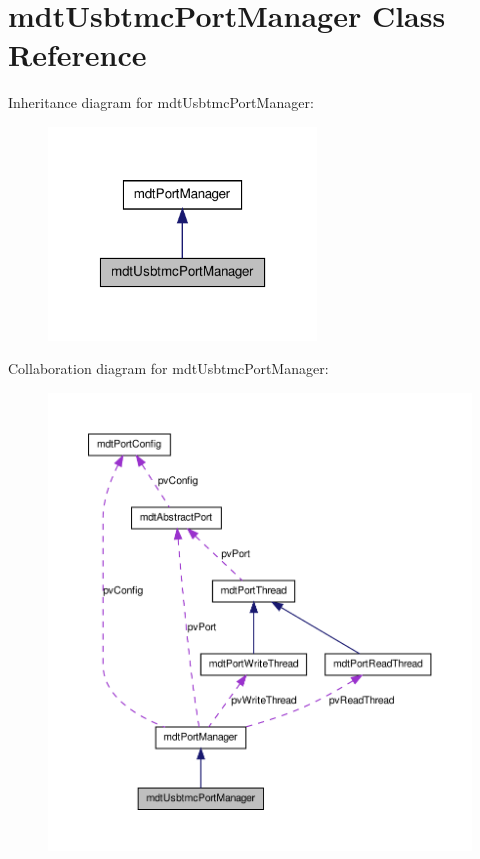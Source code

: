\hypertarget{classmdt_usbtmc_port_manager}{
\section{mdtUsbtmcPortManager Class Reference}
\label{classmdt_usbtmc_port_manager}
}


Inheritance diagram for mdtUsbtmcPortManager:\nopagebreak
\begin{figure}[H]
\begin{center}
\leavevmode
\includegraphics[width=202pt]{classmdt_usbtmc_port_manager__inherit__graph}
\end{center}
\end{figure}


Collaboration diagram for mdtUsbtmcPortManager:\nopagebreak
\begin{figure}[H]
\begin{center}
\leavevmode
\includegraphics[width=400pt]{classmdt_usbtmc_port_manager__coll__graph}
\end{center}
\end{figure}

